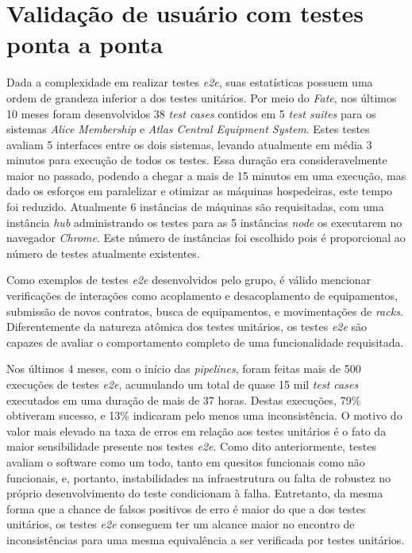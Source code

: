 \hypertarget{fate-resultados}{%
\section{Validação de usuário com testes ponta a ponta}\label{fate-resultados}}

Dada a complexidade em realizar testes \emph{e2e}, suas estatísticas possuem uma ordem de grandeza inferior a dos testes unitários. Por meio do \emph{Fate}, nos últimos 10 meses foram desenvolvidos 38 \emph{test cases} contidos em 5 \emph{test suites} para os sistemas \emph{Alice Membership} e \emph{Atlas Central Equipment System}. Estes testes avaliam 5 interfaces entre os dois sistemas, levando atualmente em média 3 minutos para execução de todos os testes. Essa duração era consideravelmente maior no passado, podendo a chegar a mais de 15 minutos em uma execução, mas dado os esforços em paralelizar e otimizar as máquinas hospedeiras, este tempo foi reduzido. Atualmente 6 instâncias de máquinas são requisitadas, com uma instância \emph{hub} administrando os testes para as 5 instâncias \emph{node} os executarem no navegador \emph{Chrome}. Este número de instâncias foi escolhido pois é proporcional ao número de testes atualmente existentes.

Como exemplos de testes \emph{e2e} desenvolvidos pelo grupo, é válido mencionar verificações de interações como acoplamento e desacoplamento de equipamentos, submissão de novos contratos, busca de equipamentos, e movimentações de \emph{racks}. Diferentemente da natureza atômica dos testes unitários, os testes \emph{e2e} são capazes de avaliar o comportamento completo de uma funcionalidade requisitada.

Nos últimos 4 meses, com o início das \emph{pipelines}, foram feitas mais de 500 execuções de testes \emph{e2e}, acumulando um total de quase 15 mil \emph{test cases} executados em uma duração de mais de 37 horas. Destas execuções, 79\% obtiveram sucesso, e 13\% indicaram pelo menos uma inconsistência. O motivo do valor mais elevado na taxa de erros em relação aos testes unitários é o fato da maior sensibilidade presente nos testes \emph{e2e}. Como dito anteriormente, testes avaliam o software como um todo, tanto em quesitos funcionais como não funcionais, e, portanto, instabilidades na infraestrutura ou falta de robustez no próprio desenvolvimento do teste condicionam à falha. Entretanto, da mesma forma que a chance de falsos positivos de erro é maior do que a dos testes unitários, os testes \emph{e2e} conseguem ter um alcance maior no encontro de inconsistências para uma mesma equivalência a ser verificada por testes unitários.

